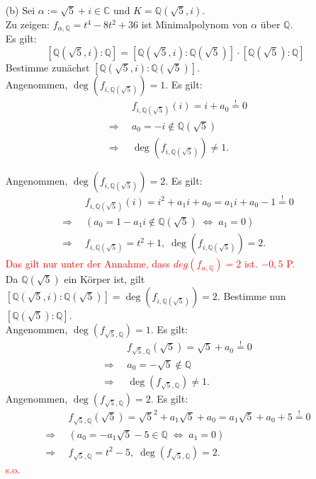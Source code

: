 \documentclass[12pt]{article}
\newcommand{\corr}[1]{\textcolor{red}{#1}}
\newcommand{\df}{\enspace\Longrightarrow\enspace}
\newcommand{\gdw}{\;\Longleftrightarrow\;}
\newcommand{\grad}{\operatorname{deg}}
\begin{document}
\begin{enumerate}
	\item[(b)] Sei $\alpha:=\sqrt{5}+i\in\mathbb{C}$ und $K=\mathbb{Q}(\sqrt{5},i)$. \\
	Zu zeigen: $f_{\alpha,\mathbb{Q}}=t^4-8t^2+36$ ist Minimalpolynom von $\alpha$ über $\mathbb{Q}$. \\
	Es gilt: $$\left[\mathbb{Q}(\sqrt{5},i):\mathbb{Q}\right]=\left[\mathbb{Q}(\sqrt{5},i):\mathbb{Q}(\sqrt{5})\right]\cdot\left[\mathbb{Q}(\sqrt{5}):\mathbb{Q}\right]$$
	Bestimme zunächst $\left[\mathbb{Q}(\sqrt{5},i):\mathbb{Q}(\sqrt{5})\right]$. \\
	Angenommen, $\grad(f_{i,\mathbb{Q}(\sqrt{5})})=1$. Es gilt:
	\begin{align*}
		&f_{i,\mathbb{Q}(\sqrt{5})}(i)=i+a_0\overset{!}{=}0 \\
		\df&a_0=-i\notin\mathbb{Q}(\sqrt{5}) \\
		\df&\grad(f_{i,\mathbb{Q}(\sqrt{5})})\neq1.
	\end{align*}
	
	Angenommen, $\grad(f_{i,\mathbb{Q}(\sqrt{5})})=2$. Es gilt:
	\begin{align*}
		&f_{i,\mathbb{Q}(\sqrt{5})}(i)=i^2+a_1i+a_0=a_1i+a_0-1\overset{!}{=}0 \\
		\df&\left(a_0=1-a_1i\notin\mathbb{Q}(\sqrt{5})\gdw a_1=0\right) \\
		\df&f_{i,\mathbb{Q}(\sqrt{5})}=t^2+1,\;\grad(f_{i,\mathbb{Q}(\sqrt{5})})=2.
	\end{align*}
\corr{Das gilt nur unter der Annahme, dass $deg(f_{\alpha,\mathbb{Q}})=2$ ist. $-0,5$ P.}\\
	Da $\mathbb{Q}(\sqrt{5})$ ein Körper ist, gilt $\left[\mathbb{Q}(\sqrt{5},i):\mathbb{Q}(\sqrt{5})\right]=\grad(f_{i,\mathbb{Q}(\sqrt{5})})=2$.
	Bestimme nun $\left[\mathbb{Q}(\sqrt{5}):\mathbb{Q}\right]$. \\
	Angenommen, $\grad(f_{\sqrt{5},\mathbb{Q}})=1$. Es gilt:
	\begin{align*}
		&f_{\sqrt{5},\mathbb{Q}}(\sqrt{5})=\sqrt{5}+a_0\overset{!}{=}0 \\
		\df&a_0=-\sqrt{5}\notin\mathbb{Q} \\
		\df&\grad(f_{\sqrt{5},\mathbb{Q}})\neq1.
	\end{align*}
	Angenommen, $\grad(f_{\sqrt{5},\mathbb{Q}})=2$. Es gilt:
	\begin{align*}
		&f_{\sqrt{5},\mathbb{Q}}(\sqrt{5})=\sqrt{5}^2+a_1\sqrt{5}+a_0=a_1\sqrt{5}+a_0+5\overset{!}{=}0 \\
		\df&\left(a_0=-a_1\sqrt{5}-5\in\mathbb{Q}\gdw a_1=0\right) \\
		\df&f_{\sqrt{5},\mathbb{Q}}=t^2-5,\;\grad(f_{\sqrt{5},\mathbb{Q}})=2.
	\end{align*}
\corr{s.o.}\\


\end{enumerate}
\end{document}
